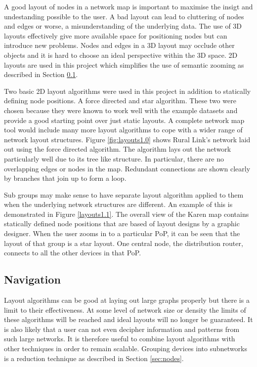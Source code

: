 \documentclass[11pt, a4paper]{article}
\begin{document}
A good layout of nodes in a network map is important to maximise the insigt and
undestanding possible to the user. A bad layout can lead to cluttering of nodes
and edges or worse, a misunderstanding of the underlying data. The use of 3D
layouts effectively give more available space for positioning nodes but can
introduce new problems. Nodes and edges in a 3D layout may occlude other objects
and it is hard to choose an ideal perspective within the 3D
space.\cite{Eades_1998} 2D layouts are used in this project which simplifies the
use of semantic zooming as described in Section \ref{sec:navigation}. 

Two basic 2D layout algorithms were used in this project in addition to
statically defining node positions. A force directed and star algorithm. These
two were chosen because they were known to work well with the example datasets
and provide a good starting point over just static layouts. A complete network
map tool would include many more layout algorithms to cope with a wider range of
network layout structures.\cite{Paul_2000} Figure \ref{fig:layouts1.0} shows
Rural Link's network laid out using the force directed algorithm. The algorithm
lays out the network particularly well due to its tree like structure. In
particular, there are no overlapping edges or nodes in the map. Redundant
connections are shown clearly by branches that join up to form a loop. 

Sub groups may make sense to have separate layout algorithm applied to them when
the underlying network structures are different. An example of this is
demonstrated in Figure \ref{layouts1.1}. The overall view of the Karen map
contains statically defined node positions that are based of layout designs by a
graphic designer. When the user zooms in to a particular PoP, it can be seen
that the layout of that group is a star layout. One central node, the
distribution router, connects to all the other devices in that PoP.


\subsection{Navigation}
\label{sec:navigation}

Layout algorithms can be good at laying out large graphs properly but there is a
limit to their effectiveness. At some level of network size or density the
limits of these algorithms will be reached and ideal layouts will no longer be
guaranteed. It is also likely that a user can not even decipher information and
patterns from such large networks. It is therefore useful to combine layout
algorithms with other techniques in order to remain scalable.\cite{Herman_1998}
Grouping devices into subnetworks is a reduction technique as described in
Section \ref{sec:nodes}. 
\end{document}
